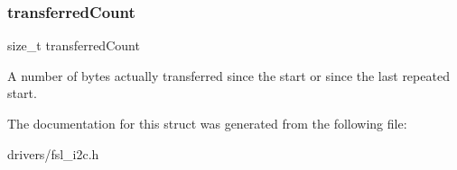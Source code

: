\subsubsection{\texorpdfstring{transferredCount}{transferredCount}}
{\footnotesize\ttfamily size\+\_\+t transferred\+Count}

A number of bytes actually transferred since the start or since the last repeated start. 

The documentation for this struct was generated from the following file\+:\begin{DoxyCompactItemize}
\item 
drivers/fsl\+\_\+i2c.\+h\end{DoxyCompactItemize}
